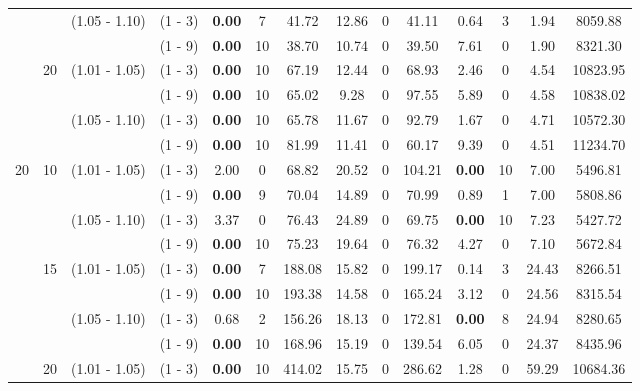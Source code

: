 \documentclass[a4paper,11pt]{article}
\begin{document}
\begin{table}[!ht]
\begin{tabular}{|c|c|c|c|c|c|c|c|c|c|c|c|c|c|}
 &  & 	 (1.05 - 1.10) & (1 - 3)  &  \textbf{0.00}  & 7 &		41.72      &  12.86  	    &  0	&  41.11      &  0.64  & 3 	&  1.94      &  8059.88 \\
 &  &  & 				 (1 - 9)  &  \textbf{0.00}  & 10 &		38.70      &  10.74  	    &  0	&  39.50      &  7.61  & 0	&  1.90      &  8321.30 \\
 & 20 &  (1.01 - 1.05) & (1 - 3)  &  \textbf{0.00} & 10 &		67.19      &  12.44  	    &  0	&  68.93      &  2.46 & 0 	&  4.54      &  10823.95 \\
 &  &  & 				 (1 - 9)  &  \textbf{0.00} & 10 &		65.02      &  9.28  	    &  0	&  97.55      &  5.89 & 0  	&  4.58      &  10838.02 \\
 &  &    (1.05 - 1.10) & (1 - 3)  &  \textbf{0.00} & 10 &		65.78      &  11.67  	    &  0	&  92.79      &  1.67 & 0 	&  4.71      &  10572.30 \\
 &  & &  				 (1 - 9)  &  \textbf{0.00} & 10 &		81.99      &  11.41  	    &  0	&  60.17      &  9.39 & 0 	&  4.51      &  11234.70 \\
20 & 10 &(1.01 - 1.05) & (1 - 3)  &  2.00 		   &  0 &		68.82      &  20.52  	    &  0	&  104.21     &  \textbf{0.00} & 10 &  7.00      &  5496.81 \\
 &  &  & 				 (1 - 9)  &  \textbf{0.00}  &  9 &		70.04      &  14.89  	    &  0	&  70.99      &  0.89  & 1 	  &  7.00      &  5808.86  \\
 &  &    (1.05 - 1.10) & (1 - 3)  &  3.37  			&  0 &      76.43 	   &  24.89         &  0	&  69.75      &  \textbf{0.00}   & 10 &  7.23      &  5427.72  \\
 &  &  & 				 (1 - 9)  &  \textbf{0.00}  & 10 &		75.23      &  19.64  	    &  0	&  76.32       &  4.27         & 0 &  7.10      &  5672.84  \\
 & 15 &  (1.01 - 1.05) & (1 - 3)  &  \textbf{0.00}  &  7 &		188.08     &  15.82 	    &  0	&  199.17      &  0.14         & 3  &  24.43      &  8266.51 \\ 
 &  &  & 				 (1 - 9)  &  \textbf{0.00}  &  10 &		193.38     &  14.58  	    &  0	&  165.24      &  3.12         & 0 &  24.56      &  8315.54 \\
 &  &    (1.05 - 1.10) & (1 - 3)  &  0.68  		   &  2  &		156.26     &  18.13 	    &  0	&  172.81      &  \textbf{0.00} & 8 &  24.94      &  8280.65 \\
 &  &  & 				 (1 - 9)  &  \textbf{0.00}  &  10 &		168.96     &  15.19  	    &  0	&  139.54      &  6.05 & 0 &  24.37      &  8435.96 \\
 & 20 &  (1.01 - 1.05) & (1 - 3)  &  \textbf{0.00} &  10 &		414.02     &  15.75  	    &  0	&  286.62      &  1.28 & 0 &  59.29      &  10684.36 \\

\end{tabular}
\end{table}
\end{document}
